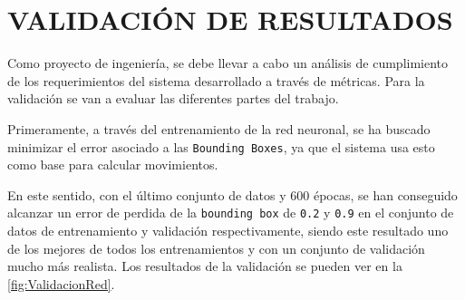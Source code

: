 \section{VALIDACIÓN DE RESULTADOS}

Como proyecto de ingeniería, se debe llevar a cabo un análisis de cumplimiento de los requerimientos del sistema desarrollado a través de métricas. Para la validación se van a evaluar las 
diferentes partes del trabajo.

Primeramente, a través del entrenamiento de la red neuronal, se ha buscado minimizar el error asociado a las \texttt{Bounding Boxes}, ya que el sistema usa esto como base para calcular movimientos. 

En este sentido, con el último conjunto de datos y 600 épocas, se han conseguido alcanzar un error de perdida de la \texttt{bounding box} de \texttt{0.2} y \texttt{0.9} en el conjunto de datos de entrenamiento 
y validación respectivamente, siendo este resultado uno de los mejores de todos los entrenamientos y con un conjunto de validación mucho más realista. Los resultados de la validación se pueden ver en la \autoref{fig:ValidacionRed}.

